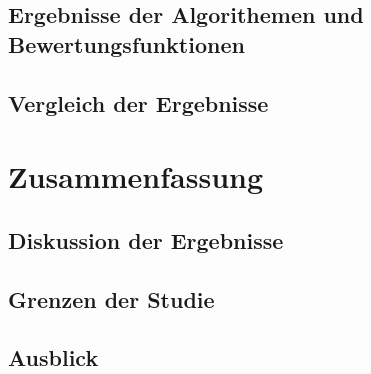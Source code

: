 \section{Ergebnisse der Algorithemen und Bewertungsfunktionen}\label{Ergebnisse der Algorithemen und Bewertungsfunktionen}

\section{Vergleich der Ergebnisse}\label{Vergleich der Ergebnisse}

\chapter{Zusammenfassung}

\section{Diskussion der Ergebnisse}\label{Diskussion der Ergebnisse}

\section{Grenzen der Studie}\label{Grenzen der Studie}

\section{Ausblick}\label{Ausblick}